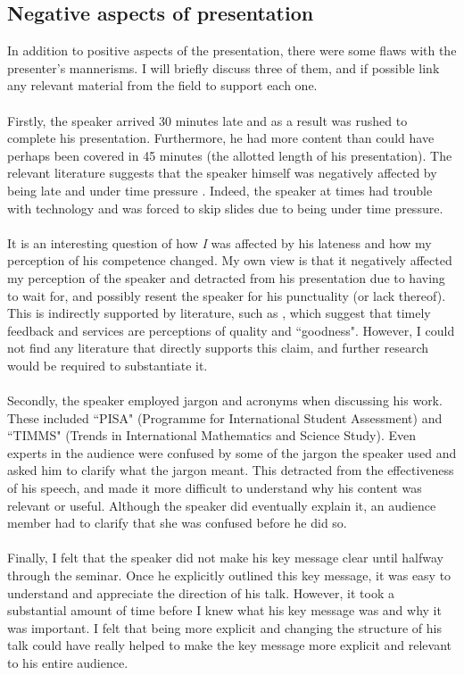 \subsection{Negative aspects of presentation} \label{semRevMinus}

In addition to positive aspects of the presentation, there were some flaws with the presenter's
mannerisms.
I will briefly discuss three of them, and if possible link any relevant material from the field to
support each one.\\
\\
Firstly, the speaker arrived 30 minutes late and as a result was rushed to complete his presentation.
Furthermore, he had more content than could have perhaps been covered in 45 minutes (the allotted
length of his presentation).
The relevant literature suggests that the speaker himself was negatively affected by being late and
under time pressure \cite{DeDreu2003280,Ahituv:1998:ETP:1189478.1189487}.
Indeed, the speaker at times had trouble with technology and was forced to skip slides due to being
under time pressure.\\
\\
It is an interesting question of how {\em I} was affected by his lateness and how my perception of
his competence changed.
My own view is that it negatively affected my perception of the speaker and detracted from his
presentation due to having to wait for, and possibly resent the speaker for his punctuality (or lack
thereof).
This is indirectly supported by literature, such as \cite{weber2002author,carson1998toward}, which
suggest that timely feedback and services are perceptions of quality and ``goodness".
However, I could not find any literature that directly supports this claim, and further research
would be required to substantiate it.\\
\\
Secondly, the speaker employed jargon and acronyms when discussing his work.
These included ``PISA" (Programme for International Student Assessment) and ``TIMMS" (Trends in
International Mathematics and Science Study).
Even experts in the audience were confused by some of the jargon the speaker used and asked him to
clarify what the jargon meant.
This detracted from the effectiveness of his speech, and made it more difficult to understand why
his content was relevant or useful.
Although the speaker did eventually explain it, an audience member had to clarify that she
was confused before he did so.\\
\\
Finally, I felt that the speaker did not make his key message clear until halfway through the
seminar.
Once he explicitly outlined this key message, it was easy to understand and appreciate the direction
of his talk.
However, it took a substantial amount of time before I knew what his key message was and why it was
important.
I felt that being more explicit and changing the structure of his talk could have really helped to
make the key message more explicit and relevant to his entire audience.
